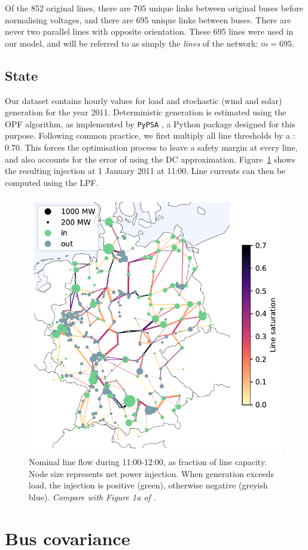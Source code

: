 \documentclass[main.tex]{subfiles}
\begin{document}
Of the 852 original lines, there are 705 unique links between original buses before normalising voltages, and there are 695 unique links between buses. There are never two parallel lines with opposite orientation. These 695 lines were used in our model, and will be referred to as simply the \emph{lines} of the network: $m = 695$.

\subsection{State}
Our dataset contains hourly values for load and stochastic (wind and solar) generation for the year 2011. Deterministic generation is estimated using the OPF algorithm, as implemented by \texttt{PyPSA} \citep{PyPSA}, a Python package designed for this purpose. Following common practice, we first multiply all line thresholds by a : $0.70$. This forces the optimisation process to leave a safety margin at every line, and also accounts for the error of using the DC approximation. Figure~\ref{fig:nominalflowandinjection} shows the resulting injection at 1 January 2011 at 11:00. Line currents can then be computed using the LPF.

\begin{figure}[ht]
    \centering
    \includegraphics[width=.6\textwidth]{img/nominal_flow_and_injection.pdf}
    \caption{
    \label{fig:nominalflowandinjection}Nominal line flow during 11:00-12:00, as fraction of line capacity. Node size represents net power injection. When generation exceeds load, the injection is positive (green), otherwise negative (greyish blue). \emph{Compare with Figure 1a of \cite{Nesti2018emergentfailures}.}}
\end{figure}

\section{Bus covariance}
\end{document}
